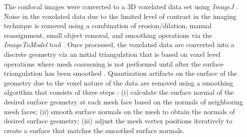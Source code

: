 \documentclass[]{interact}
\begin{document}
The confocal images were converted to a 3D voxelated data set using \textit{ImageJ} \citep{Schneider:2012dw}. Noise in the voxelated data due to the limited level of contrast in the imaging technique is removed using a combination of erosion/dilation, manual reassignment, small object removal, and smoothing operations via the \textit{ImageToModel} tool \citep{Klaas:2013ug, Klaas_conference, simmetrix}. Once processed, the voxelated data are converted into a discrete geometry via an initial triangulation that is based on voxel level operations where mesh coarsening is not performed until after the surface triangulation has been smoothed \citep{Klaas:2013ug}. Quantization artifacts on the surface of the geometry due to the voxel nature of the data are removed using a smoothing algorithm that consists of three steps \citep{Klaas:2013ug}: (i) calculate the surface normal of the desired surface geometry at each mesh face based on the normals of neighboring mesh faces; (ii) smooth surface normals on the mesh to obtain the normals of desired surface geometry; (iii) adjust the mesh vertex positions iteratively to create a surface that matches the smoothed surface normals.
\end{document}
